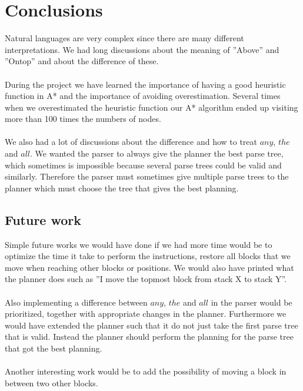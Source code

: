 \chapter{Conclusions}
Natural languages are very complex since there are many different
interpretations. We had long discussions about the meaning of ''Above'' and
''Ontop'' and about the difference of these.  
\\\\
During the project we have learned the importance of having a good heuristic
function in A* and the importance of avoiding overestimation.  Several times
when we overestimated the heuristic function our A* algorithm ended up visiting
more than 100 times the numbers of nodes. 
\\\\
We also had a lot of discussions about the difference and how to treat $any$,
$the$ and $all$. We wanted the parser to always give the planner the best parse
tree, which sometimes is impossible because several parse trees could be valid
and similarly. Therefore the parser must sometimes give multiple parse trees to
the planner which must choose the tree that gives the best planning.

\section{Future work}
Simple future works we would have done if we had more time would be to optimize
the time it take to perform the instructions, restore all blocks that we move
when reaching other blocks or positions. We would also have printed what the
planner does such as ''I move the topmost block from stack X to stack Y''.
\\\\
Also implementing a difference between $any$, $the$ and $all$ in the parser
would be prioritized, together with appropriate changes in the planner.
Furthermore we would have extended the planner such that it do not just take the
first parse tree that is valid. Instead the planner should perform the planning
for the parse tree that got the best planning. 
\\\\
Another interesting work would be to add the possibility of moving a block
in between two other blocks. 
